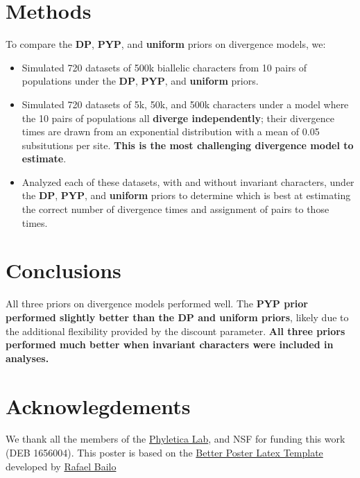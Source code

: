 \documentclass[a0paper,fleqn]{betterposter}
\begin{document}
{%
\vfill


}{

\vspace{-4ex}
\section{Methods}
To compare the \textbf{DP}, \textbf{PYP}, and \textbf{uniform} priors on
divergence models, we:
\begin{itemize}
\item Simulated 720 datasets of 500k biallelic characters from 10 pairs of
    populations under the \textbf{DP}, \textbf{PYP}, and \textbf{uniform}
    priors.
\item Simulated 720 datasets of 5k, 50k, and 500k characters under a model
    where the 10 pairs of populations all \textbf{diverge independently};
    their divergence times are drawn from an exponential distribution with a
    mean of 0.05 subsitutions per site.
    \textbf{This is the most challenging divergence model to estimate}.
\item Analyzed each of these datasets, with and without invariant characters,
    under the \textbf{DP}, \textbf{PYP}, and \textbf{uniform} priors
    to determine which is best at estimating the correct number of divergence
    times and assignment of pairs to those times.
\end{itemize}

\vspace{-1ex}
\section{Conclusions}
All three priors on divergence models performed well.
The \textbf{PYP prior performed slightly better than the DP and uniform
    priors},
likely due to the additional flexibility provided by the discount parameter.
\textbf{All three priors performed much better when invariant characters were
included in analyses.}

\vspace{-1ex}
\section{Acknowlegdements}
We thank all the members of the
\href{http://phyletica.org}{Phyletica Lab},
and NSF for funding this work (DEB 1656004).
This poster is based on the
\href{https://github.com/rafaelbailo/betterposter-latex-template}{Better Poster Latex Template}
developed by
\href{https://github.com/rafaelbailo}{Rafael Bailo}

}
\end{document}
